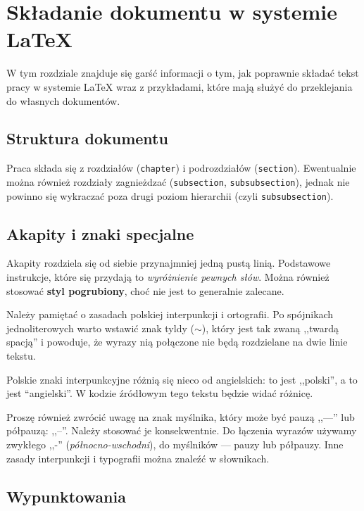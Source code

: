 
\chapter{Składanie dokumentu w systemie \LaTeX}

W tym rozdziale znajduje się
garść informacji o tym, jak poprawnie składać tekst pracy w systemie \LaTeX{} wraz z
przykładami, które mają służyć do przeklejania do własnych dokumentów.

\section{Struktura dokumentu}

Praca składa się z rozdziałów (\texttt{chapter}) i podrozdziałów (\texttt{section}).
Ewentualnie można również rozdziały zagnieżdzać (\texttt{subsection}, \texttt{subsubsection}),
jednak nie powinno się wykraczać poza drugi poziom hierarchii (czyli \texttt{subsubsection}).

\section{Akapity i znaki specjalne}

Akapity rozdziela się od siebie przynajmniej jedną pustą linią. Podstawowe
instrukcje, które się przydają to \emph{wyróżnienie pewnych słów}. Można również
stosować \textbf{styl pogrubiony}, choć nie jest to generalnie zalecane.

Należy pamiętać o zasadach polskiej interpunkcji i ortografii. Po spójnikach
jednoliterowych warto wstawić znak tyldy ($\sim$), który jest tak zwaną
,,twardą spacją'' i powoduje, że wyrazy nią połączone nie będą rozdzielane
na dwie linie tekstu.

Polskie znaki interpunkcyjne różnią się nieco od angielskich: to jest ,,polski'', a to jest
``angielski''. W kodzie źródłowym tego tekstu będzie widać różnicę.

Proszę również zwrócić uwagę na znak myślnika, który może być pauzą ,,---'' lub
półpauzą: ,,--''. Należy stosować je konsekwentnie. Do łączenia wyrazów używamy
zwykłego ,,-'' (\emph{północno-wschodni}), do myślników --- pauzy lub półpauzy.
Inne zasady interpunkcji i typografii można znaleźć w słownikach.

\section{Wypunktowania}

